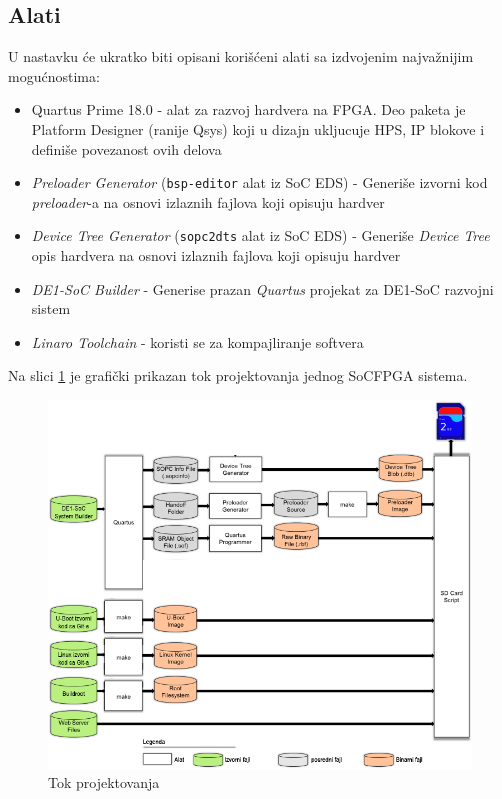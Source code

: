 \subsection{Alati}
U nastavku će ukratko biti opisani korišćeni alati sa izdvojenim najvažnijim mogućnostima:
\begin{itemize}
\item Quartus Prime 18.0 - alat za razvoj hardvera na FPGA. Deo paketa je Platform Designer (ranije Qsys) koji u dizajn ukljucuje HPS, IP blokove i definiše povezanost ovih delova
\item \textit{Preloader Generator} (\texttt{bsp-editor} alat iz SoC EDS) - Generiše izvorni kod \textit{preloader}-a na osnovi izlaznih fajlova koji opisuju hardver
\item \textit{Device Tree Generator} (\texttt{sopc2dts} alat iz SoC EDS) - Generiše \textit{Device Tree} opis hardvera na osnovi izlaznih fajlova koji opisuju hardver
\item \textit{DE1-SoC Builder} - Generise prazan \textit{Quartus} projekat za DE1-SoC razvojni sistem
\item \textit{Linaro Toolchain} - koristi se za kompajliranje softvera
\end{itemize}

Na slici \ref{slika1:gsrd} je grafički prikazan tok projektovanja jednog SoCFPGA sistema.

\begin{figure}[h!]
\centering
\includegraphics[scale=1.3]{img/gsrd-flow.png}
\caption{Tok projektovanja}
\label{slika1:gsrd}
\end{figure}

